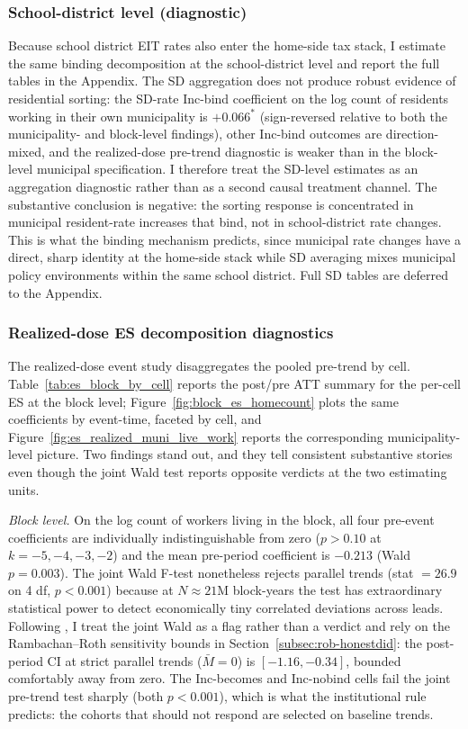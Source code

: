 \documentclass[12pt]{article}
\begin{document}
\subsubsection{School-district level (diagnostic)}
\label{subsec:results-sd}

Because school district EIT rates also enter the home-side tax
stack, I estimate the same binding decomposition at the
school-district level and report the full tables in the Appendix.
The SD aggregation does not produce robust evidence of residential
sorting: the SD-rate Inc-bind coefficient on the log count of
residents working in their own municipality is $+0.066^{*}$
(sign-reversed relative to both the municipality- and block-level
findings), other Inc-bind outcomes are direction-mixed, and the
realized-dose pre-trend diagnostic is weaker than in the block-level
municipal specification. I therefore treat the SD-level estimates as
an aggregation diagnostic rather than as a second causal treatment
channel. The substantive conclusion is negative: the sorting
response is concentrated in municipal resident-rate increases that
bind, not in school-district rate changes. This is what the
binding mechanism predicts, since municipal rate changes have
a direct, sharp identity at the home-side stack while SD averaging
mixes municipal policy environments within the same school district.
Full SD tables are deferred to the Appendix.

\subsubsection{Realized-dose ES decomposition diagnostics}
\label{subsubsec:decomp-es}

The realized-dose event study disaggregates the pooled pre-trend by
cell. Table~\ref{tab:es_block_by_cell} reports the
post/pre ATT summary for the per-cell ES at the block level;
Figure~\ref{fig:block_es_homecount} plots the same coefficients by
event-time, faceted by cell, and
Figure~\ref{fig:es_realized_muni_live_work} reports the corresponding
municipality-level picture. Two findings stand out, and they tell consistent
substantive stories even though the joint Wald test reports opposite
verdicts at the two estimating units.

\textit{Block level.} On the log count of workers living in the
block, all four pre-event coefficients are individually
indistinguishable from zero ($p > 0.10$ at $k=-5,-4,-3,-2$) and the
mean pre-period coefficient is $-0.213$ (Wald $p=0.003$). The joint Wald F-test
nonetheless rejects parallel trends (stat $=26.9$ on 4 df,
$p < 0.001$) because at $N \approx 21$M block-years the test has
extraordinary statistical power to detect economically tiny
correlated deviations across leads. Following
\citet{rambachanMoreCredibleApproach2023}, I treat the joint Wald as
a flag rather than a verdict and rely on the Rambachan--Roth
sensitivity bounds in Section~\ref{subsec:rob-honestdid}: the post-period
CI at strict parallel trends ($\bar{M}=0$) is $[-1.16, -0.34]$,
bounded comfortably away from zero. The Inc-becomes and Inc-nobind
cells fail the joint pre-trend test sharply (both $p<0.001$), which
is what the institutional rule predicts: the cohorts that should not
respond are selected on baseline trends.
\end{document}
